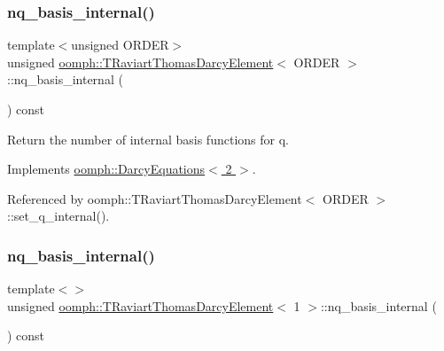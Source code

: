 \subsubsection{\texorpdfstring{nq\+\_\+basis\+\_\+internal()}{nq\_basis\_internal()}\hspace{0.1cm}{\footnotesize\ttfamily [2/3]}}
{\footnotesize\ttfamily template$<$unsigned O\+R\+D\+ER$>$ \\
unsigned \hyperlink{classoomph_1_1TRaviartThomasDarcyElement}{oomph\+::\+T\+Raviart\+Thomas\+Darcy\+Element}$<$ O\+R\+D\+ER $>$\+::nq\+\_\+basis\+\_\+internal (\begin{DoxyParamCaption}{ }\end{DoxyParamCaption}) const\hspace{0.3cm}{\ttfamily [virtual]}}



Return the number of internal basis functions for q. 



Implements \hyperlink{classoomph_1_1DarcyEquations_ad1836d0919835cd1d5f6af654ca03a52}{oomph\+::\+Darcy\+Equations$<$ 2 $>$}.



Referenced by oomph\+::\+T\+Raviart\+Thomas\+Darcy\+Element$<$ O\+R\+D\+E\+R $>$\+::set\+\_\+q\+\_\+internal().

\mbox{\label{classoomph_1_1TRaviartThomasDarcyElement_a38c41f037fc2b1386011b2c5d67c3f4f}} 
\subsubsection{\texorpdfstring{nq\+\_\+basis\+\_\+internal()}{nq\_basis\_internal()}\hspace{0.1cm}{\footnotesize\ttfamily [3/3]}}
{\footnotesize\ttfamily template$<$$>$ \\
unsigned \hyperlink{classoomph_1_1TRaviartThomasDarcyElement}{oomph\+::\+T\+Raviart\+Thomas\+Darcy\+Element}$<$ 1 $>$\+::nq\+\_\+basis\+\_\+internal (\begin{DoxyParamCaption}{ }\end{DoxyParamCaption}) const\hspace{0.3cm}{\ttfamily [virtual]}}



